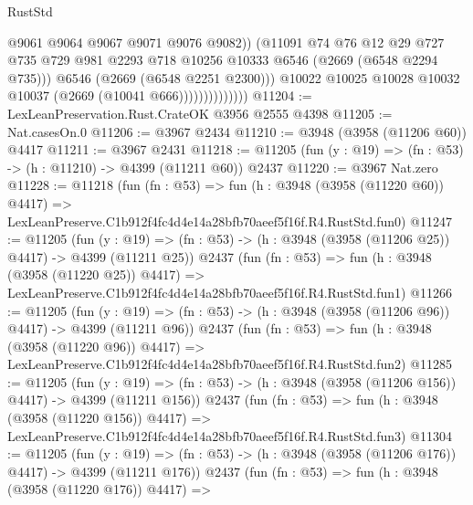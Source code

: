 \begin{lexlean}{RustStd}
\begin{coremodule}
                                  @9061
                                  @9064
                                  @9067
                                  @9071
                                  @9076
                                  @9082))
                              (@11091
                                @74
                                @76
                                @12
                                @29
                                @727
                                @735
                                @729
                                @981
                                @2293
                                @718
                                @10256
                                @10333
                                @6546
                                (@2669 (@6548 @2294 @735)))
                              @6546
                              (@2669 (@6548 @2251 @2300)))
                            @10022
                            @10025
                            @10028
                            @10032
                            @10037
                            (@2669 (@10041 @666))))))))))))))
@11204 := LexLeanPreservation.Rust.CrateOK @3956 @2555 @4398
@11205 := Nat.casesOn.{0}
@11206 := @3967 @2434
@11210 := @3948 (@3958 (@11206 @60)) @4417
@11211 := @3967 @2431
@11218 := @11205 (fun (y : @19) => (fn : @53) -> (h : @11210) -> @4399 (@11211 @60)) @2437
@11220 := @3967 Nat.zero
@11228 := @11218
    (fun (fn : @53) =>
    fun (h : @3948 (@3958 (@11220 @60)) @4417) =>
    LexLeanPreserve.C1b912f4fc4d4e14a28bfb70aeef5f16f.R4.RustStd.fun0)
@11247 := @11205
    (fun (y : @19) => (fn : @53) -> (h : @3948 (@3958 (@11206 @25)) @4417) -> @4399 (@11211 @25))
    @2437
    (fun (fn : @53) =>
    fun (h : @3948 (@3958 (@11220 @25)) @4417) =>
    LexLeanPreserve.C1b912f4fc4d4e14a28bfb70aeef5f16f.R4.RustStd.fun1)
@11266 := @11205
    (fun (y : @19) => (fn : @53) -> (h : @3948 (@3958 (@11206 @96)) @4417) -> @4399 (@11211 @96))
    @2437
    (fun (fn : @53) =>
    fun (h : @3948 (@3958 (@11220 @96)) @4417) =>
    LexLeanPreserve.C1b912f4fc4d4e14a28bfb70aeef5f16f.R4.RustStd.fun2)
@11285 := @11205
    (fun (y : @19) => (fn : @53) -> (h : @3948 (@3958 (@11206 @156)) @4417) -> @4399 (@11211 @156))
    @2437
    (fun (fn : @53) =>
    fun (h : @3948 (@3958 (@11220 @156)) @4417) =>
    LexLeanPreserve.C1b912f4fc4d4e14a28bfb70aeef5f16f.R4.RustStd.fun3)
@11304 := @11205
    (fun (y : @19) => (fn : @53) -> (h : @3948 (@3958 (@11206 @176)) @4417) -> @4399 (@11211 @176))
    @2437
    (fun (fn : @53) =>
    fun (h : @3948 (@3958 (@11220 @176)) @4417) =>

\end{coremodule}
\end{lexlean}

